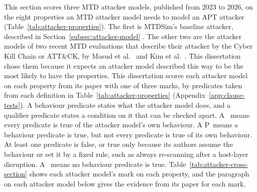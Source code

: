 \documentclass{cshonours}
\newcommand{\propmet}{\ding{51}}
\newcommand{\propnone}{\ding{55}}
\newcommand{\propstandin}{P}
\begin{document}
This section scores three MTD attacker models, published from 2023 to
2026, on the eight properties an MTD attacker model needs to model an APT
attacker (Table~\ref{tab:attacker-properties}). The first is MTDSim's
baseline attacker, described in Section~\ref{subsec:attacker-model}
\citep{brown2023, zhang2023}. The other two are the attacker models of two
recent MTD evaluations that describe their attacker by the Cyber Kill
Chain or ATT\&CK, by Masud et al.\ \citep{masud2025} and Kim et al.\
\citep{kim2026}. This dissertation chose them because it expects an
attacker model described this way to be the most likely to have the
properties. This dissertation scores each attacker model on each property
from its paper with one of three marks, by predicates taken from each definition in
Table~\ref{tab:attacker-properties} (Appendix~\ref{app:clause-tests}). A behaviour predicate states what the attacker model
does, and a qualifier predicate states a condition on it that can be checked
apart. A \propmet\ means every predicate is true of the attacker model's own
behaviour. A \propstandin\ means a behaviour predicate is true, but not every
predicate is true of its own behaviour. At least one predicate is false, or true only
because its authors assume the behaviour or set it by a fixed rule, such as always
re-scanning after a host-layer disruption. A \propnone\ means
no behaviour predicate is true. Table~\ref{tab:attacker-cross-section} shows each
attacker model's mark on each property, and the paragraph on each attacker
model below gives the evidence from its paper for each mark.
\end{document}

